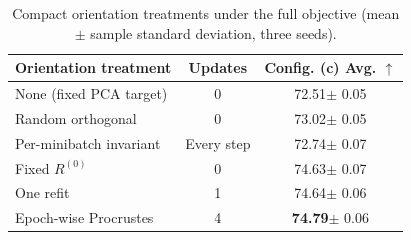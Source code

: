 \begin{table}[!t]
    \centering
    \caption{Compact orientation treatments under the full objective (mean
    $\pm$ sample standard deviation, three seeds).}
    \label{tab:gauge-mechanism}
    \small
    \newcommand{\gcell}[2]{#1{\tiny $\pm$ #2}}
    \setlength{\tabcolsep}{5pt}
    \begin{tabular}{@{}lcc@{}}
        \toprule
        Orientation treatment & Updates & Config. (c) Avg. $\uparrow$ \\
        \midrule
        None (fixed PCA target) & 0 & \gcell{72.51}{0.05} \\
        Random orthogonal & 0 & \gcell{73.02}{0.05} \\
        Per-minibatch invariant & Every step & \gcell{72.74}{0.07} \\
        Fixed $R^{(0)}$ & 0 & \gcell{74.63}{0.07} \\
        One refit & 1 & \gcell{74.64}{0.06} \\
        Epoch-wise Procrustes & 4
        & \gcell{\textbf{74.79}}{0.06} \\
        \bottomrule
    \end{tabular}
\end{table}
